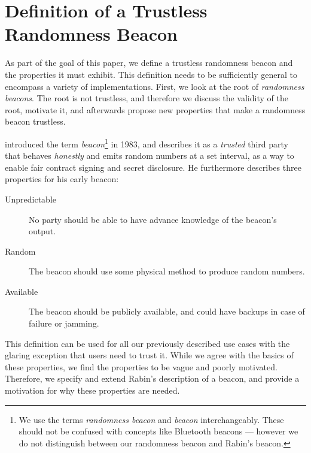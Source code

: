 \section{Definition of a Trustless Randomness Beacon}\label{sec:beacons}

As part of the goal of this paper, we define a trustless randomness beacon and the properties it must exhibit.
This definition needs to be sufficiently general to encompass a variety of implementations.
First, we look at the root of \emph{randomness beacons}.
The root is not trustless, and therefore we discuss the validity of the root, motivate it, and afterwards propose new properties that make a randomness beacon trustless.

\citet{rabin1983transaction} introduced the term \emph{beacon}\footnote{We use the terms \emph{randomness beacon} and \emph{beacon} interchangeably.
These should not be confused with concepts like Bluetooth beacons --- however we do not distinguish between our randomness beacon and Rabin's beacon.} in 1983, and describes it as a \emph{trusted} third party that behaves \emph{honestly} and emits random numbers at a set interval, as a way to enable fair contract signing and secret disclosure.
He furthermore describes three properties for his early beacon:

\begin{description}
    \item[Unpredictable] No party should be able to have advance knowledge of the beacon's output.
    \item[Random] The beacon should use some physical method to produce random numbers.
    \item[Available] The beacon should be publicly available, and could have backups in case of failure or jamming.
\end{description}

This definition can be used for all our previously described use cases with the glaring exception that users need to trust it.
While we agree with the basics of these properties, we find the properties to be vague and poorly motivated.
Therefore, we specify and extend Rabin's description of a beacon, and provide a motivation for why these properties are needed.
